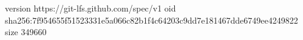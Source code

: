 version https://git-lfs.github.com/spec/v1
oid sha256:7f954655f51523331e5a066c82b1f4c64203c9dd7e181467dde6749ee4249822
size 349660
